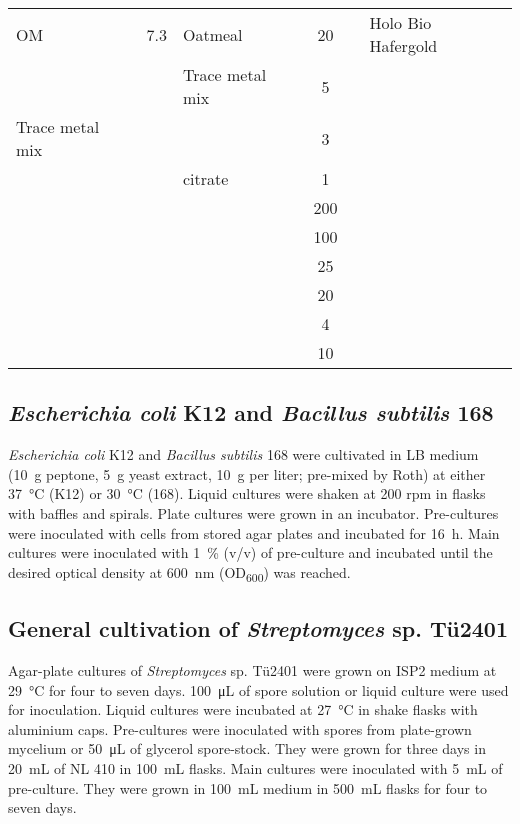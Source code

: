 \begin{table}[htbp]
\begin{tabularx}{\textwidth}{XSXS[table-format=3.0]@{\,}s[table-unit-alignment = left]X}
		\midrule
		OM 		& 7.3		& Oatmeal				& 20	& \gram	&	Holo Bio Hafergold	\\
				&			& Trace metal mix		& 5		& \milli\liter	&\\
		\midrule
		Trace metal mix &	& 	& 3		& \gram	&		\\
		 		&			&  citrate	& 1		& \gram	&		\\
		 		&			& 		& 200	& \milli\gram	&\\
		 		&			& 			& 100	& \milli\gram	&\\
		 		&			& 	& 25	& \milli\gram	&\\
		 		&			& 	& 20	& \milli\gram	&\\
		 		&			& 	& 4		& \milli\gram	&\\
		 		&			& 	& 10	& \milli\gram	&\\
		\bottomrule
	\end{tabularx}
\end{table}


\subsection{\emph{Escherichia coli} K12 and \emph{Bacillus subtilis} 168} %
\label{sub:escherichia_coli_k12}

\emph{Escherichia coli} K12 and \emph{Bacillus subtilis} 168 were cultivated in LB medium (\SI{10}{\gram} peptone, \SI{5}{\gram} yeast extract, \SI{10}{\gram}  per liter; pre-mixed by Roth) at either \SI{37}{\celsius} (K12) or \SI{30}{\celsius} (168).
Liquid cultures were shaken at 200 rpm in flasks with baffles and spirals.
Plate cultures were grown in an incubator. Pre-cultures were inoculated with cells from stored agar plates and incubated for \SI{16}{\hour}.
Main cultures were inoculated with 1~\% (v/v) of pre-culture and incubated until the desired optical density at \SI{600}{\nano\meter} (OD\textsubscript{600}) was reached.

\subsection{General cultivation of \emph{Streptomyces} sp. Tü2401} %
\label{sub:methods_general_cult}

Agar-plate cultures of \textit{Streptomyces} sp. Tü2401 were grown on ISP2 medium at \SI{29}{\celsius} for four to seven days.
\SI{100}{\micro\liter} of spore solution or liquid culture were used for inoculation.
Liquid cultures were incubated at \SI{27}{\celsius} in shake flasks with aluminium caps.
Pre-cultures were inoculated with spores from plate-grown mycelium or \SI{50}{\micro\liter} of glycerol spore-stock.
They were grown for three days in \SI{20}{\milli\liter} of NL 410 in \SI{100}{\milli\liter} flasks.
Main cultures were inoculated with \SI{5}{\milli\liter} of pre-culture.
They were grown in \SI{100}{\milli\liter} medium in \SI{500}{\milli\liter} flasks for four to seven days.

